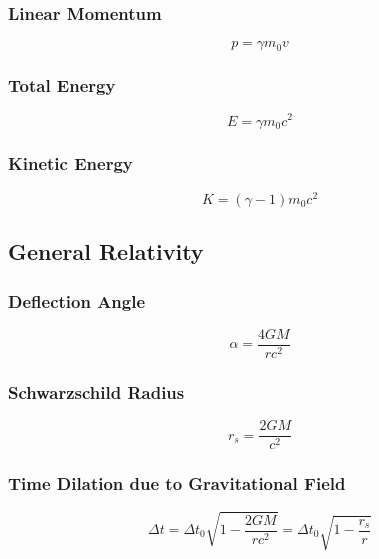 \documentclass{article}
\begin{document}
\subsubsection*{Linear Momentum}
\[p=\gamma m_0v\]

\subsubsection*{Total Energy}
\[E=\gamma m_0c^2\]

\subsubsection*{Kinetic Energy}
\[K=(\gamma -1) m_0c^2\]

\subsection*{General Relativity}
\subsubsection*{Deflection Angle}
\[\alpha=\frac{4GM}{rc^2}\]

\subsubsection*{Schwarzschild Radius}
\[r_s=\frac{2GM}{c^2}\]

\subsubsection*{Time Dilation due to Gravitational Field}
\[\Delta t=\Delta t_0 \sqrt{1-\frac{2GM}{rc^2}}=\Delta t_0 \sqrt{1-\frac{r_s}{r}}\]
\end{document}
